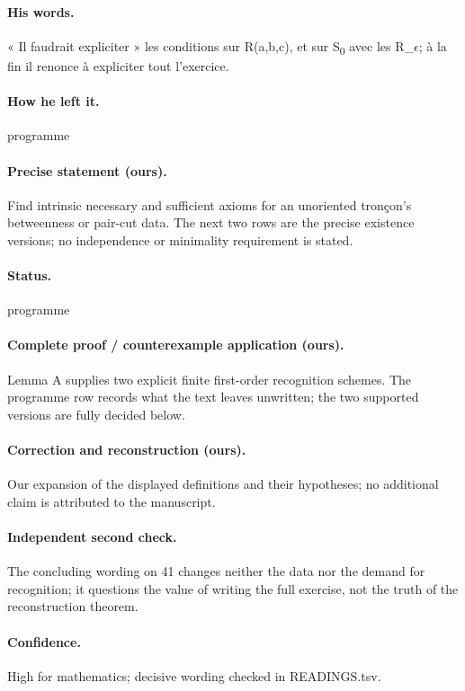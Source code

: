\paragraph{His words.} « Il faudrait expliciter » les conditions sur R(a,b,c), et sur S\textsubscript{0} avec les R\_\ensuremath{\epsilon}; à la fin il renonce à expliciter tout l’exercice.

\paragraph{How he left it.} programme

\paragraph{Precise statement (ours).} Find intrinsic necessary and sufficient axioms for an unoriented tronçon’s betweenness or pair-cut data. The next two rows are the precise existence versions; no independence or minimality requirement is stated.

\paragraph{Status.} programme

\paragraph{Complete proof / counterexample application (ours).} Lemma A supplies two explicit finite first-order recognition schemes. The programme row records what the text leaves unwritten; the two supported versions are fully decided below.

\paragraph{Correction and reconstruction (ours).} Our expansion of the displayed definitions and their hypotheses; no additional claim is attributed to the manuscript.

\paragraph{Independent second check.} The concluding wording on 41 changes neither the data nor the demand for recognition; it questions the value of writing the full exercise, not the truth of the reconstruction theorem.

\paragraph{Confidence.} High for mathematics; decisive wording checked in READINGS.tsv.

